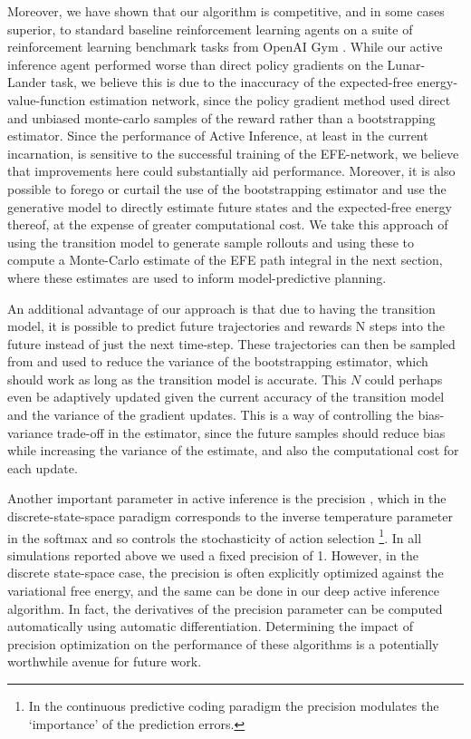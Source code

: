 Moreover, we have shown that our algorithm is competitive, and in some cases superior, to standard baseline reinforcement learning agents on a suite of reinforcement learning benchmark tasks from OpenAI Gym \citep{brockman2016openai}. While our active inference agent performed worse than direct policy gradients on the Lunar-Lander task, we believe this is due to the inaccuracy of the expected-free energy-value-function estimation network, since the policy gradient method used direct and unbiased monte-carlo samples of the reward rather than a bootstrapping estimator. Since the performance of Active Inference, at least in the current incarnation, is sensitive to the successful training of the EFE-network, we believe that improvements here could substantially aid performance. Moreover, it is also possible to forego or curtail the use of the bootstrapping estimator and use the generative model to directly estimate future states and the expected-free energy thereof, at the expense of greater computational cost. We take this approach of using the transition model to generate sample rollouts and using these to compute a Monte-Carlo estimate of the EFE path integral in the next section, where these estimates are used to inform model-predictive planning.

An additional advantage of our approach is that due to having the transition model, it is possible to predict future trajectories and rewards N steps into the future instead of just the next time-step. These trajectories can then be sampled from and used to reduce the variance of the bootstrapping estimator, which should work as long as the transition model is accurate. This $N$ could perhaps even be adaptively updated given the current accuracy of the transition model and the variance of the gradient updates. This is a way of controlling the bias-variance trade-off in the estimator, since the future samples should reduce bias while increasing the variance of the estimate, and also the computational cost for each update. 
\newline

Another important parameter in active inference is the precision \citep*{feldman2010attention,kanai2015cerebral}, which in the discrete-state-space paradigm corresponds to the inverse temperature parameter in the softmax and so controls the stochasticity of action selection \footnote{In the continuous predictive coding paradigm the precision modulates the `importance' of the prediction errors.}. In all simulations reported above we used a fixed precision of 1. However, in the discrete state-space case, the precision is often explicitly optimized against the variational free energy, and the same can be done in our deep active inference algorithm. In fact, the derivatives of the precision parameter can be computed automatically using automatic differentiation. Determining the impact of precision optimization on the performance of these algorithms is a potentially worthwhile avenue for future work. 

